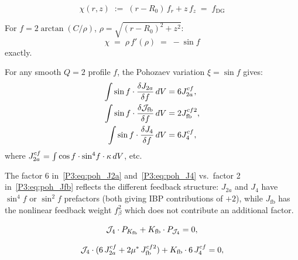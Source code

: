\begin{equation}
  \chi(r,z) \;:=\; (r-R_0)\,f_r + z\,f_z \;=\; f_{\mathrm{DG}}
  \label{P3:eq:chi_def}
\end{equation}

\begin{lemma}[BS profile identity $\chi = -\sin f$]
\label{P3:lem:chi_sinf}
For $f = 2\arctan(C/\rho)$, $\rho = \sqrt{(r-R_0)^2+z^2}$:
\begin{equation}
  \chi \;=\; \rho\,f'(\rho) \;=\; -\sin f
  \label{P3:eq:chi_sinf}
\end{equation}
exactly.
\end{lemma}

\begin{proposition}
\label{P3:prop:pohozaev_a}
For any smooth $Q=2$ profile $f$, the Pohozaev variation $\xi=\sin f$ gives:
\begin{align}
  \int \sin f\cdot\frac{\delta J_{2a}}{\delta f}\,dV &= 6J_{2a}^{cf}, \label{P3:eq:poh_J2a}\\
  \int \sin f\cdot\frac{\delta \mathcal{J}_{\mathrm{fb}}}{\delta f}\,dV &= 2J_{\mathrm{fb}}^{cf2}, \label{P3:eq:poh_Jfb}\\
  \int \sin f\cdot\frac{\delta J_4}{\delta f}\,dV &= 6J_4^{cf}, \label{P3:eq:poh_J4}
\end{align}
where $J_{2a}^{cf} = \int\cos f\cdot\sin^4\!f\cdot\kappa\,dV$, etc.
\end{proposition}

\begin{remark}
\label{P3:rem:factor6_vs_2}
The factor 6 in~\eqref{P3:eq:poh_J2a} and~\eqref{P3:eq:poh_J4} vs.\ factor 2
in~\eqref{P3:eq:poh_Jfb} reflects the different feedback structure:
$J_{2a}$ and $J_4$ have $\sin^4\!f$ or $\sin^2\!f$ prefactors (both
giving IBP contributions of $+2$), while $J_{\mathrm{fb}}$ has the
nonlinear feedback weight $f_\beta^2$ which does not contribute an
additional factor.
\end{remark}

\begin{equation}
  \mathcal{J}_4\cdot P_{K_{\mathrm{fb}}} + K_{\mathrm{fb}}\cdot P_{\mathcal{J}_4} = 0,
  \label{P3:eq:pohozaev_efb}
\end{equation}

\begin{equation}
  \mathcal{J}_4\cdot(6\,J_{2a}^{cf} + 2\mu^*\,J_{\mathrm{fb}}^{cf2}) + K_{\mathrm{fb}}\cdot 6\,J_4^{cf} = 0,
  \label{P3:eq:poh_A_full}
\end{equation}

